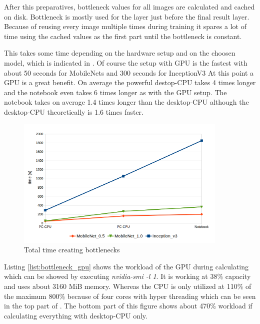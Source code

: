 After this preparatives, bottleneck values for all images are calculated and cached on disk. Bottleneck is mostly used for the layer just before the final result layer. Because of reusing every image multiple times during training it spares a lot of time using the cached values as the first part until the bottleneck is constant.

This takes some time depending on the hardware setup and on the choosen model, which is indicated in . Of course the setup with GPU is the fastest with about 50 seconds for MobileNets and 300 seconds for InceptionV3 At this point a GPU is a great benefit. On average the powerful destop-CPU takes 4 times longer and the notebook even takes 6 times longer as with the GPU setup. The notebook takes on average 1.4 times longer than the desktop-CPU although the desktop-CPU theoretically is 1.6 times faster.

\begin{figure}[htbp]
\centering
\includegraphics[width=0.9\textwidth]{includes/bottlenecks}
\caption[Total time creating bottlenecks]{Total time creating bottlenecks}
\label{fig:bottlenecks}
\end{figure}

Listing \ref{list:bottleneck_gpu} shows the workload of the GPU during calculating which can be showed by executing \textit{nvidia-smi -l 1}. It is working at 38\% capacity and uses about 3160 MiB memory. Whereas the CPU is only utilized at 110\% of the maximum 800\% because of four cores with hyper threading which can be seen in the top part of . The bottom part of this figure shows about 470\% workload if calculating everything with desktop-CPU only.

